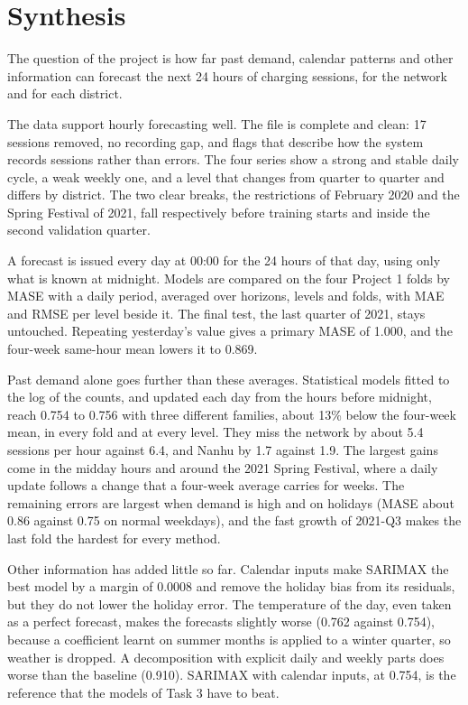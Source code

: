 \documentclass[12pt,a4paper,openany]{report}
\begin{document}
\chapter{Synthesis}\label{ch:synthesis}

The question of the project is how far past demand, calendar patterns and other information can forecast the next
24 hours of charging sessions, for the network and for each district.

The data support hourly forecasting well. The file is complete and clean: 17 sessions removed, no recording gap, and
flags that describe how the system records sessions rather than errors. The four series show a strong and stable
daily cycle, a weak weekly one, and a level that changes from quarter to quarter and differs by district. The two
clear breaks, the restrictions of February 2020 and the Spring Festival of 2021, fall respectively before training
starts and inside the second validation quarter.

A forecast is issued every day at 00:00 for the 24 hours of that day, using only what is known at midnight. Models
are compared on the four Project 1 folds by \ac{MASE} with a daily period, averaged over horizons, levels and folds,
with \ac{MAE} and \ac{RMSE} per level beside it. The final test, the last quarter of 2021, stays untouched. Repeating
yesterday's value gives a primary \ac{MASE} of 1.000, and the four-week same-hour mean lowers it to 0.869.

Past demand alone goes further than these averages. Statistical models fitted to the log of the counts, and updated
each day from the hours before midnight, reach 0.754 to 0.756 with three different families, about 13\% below the
four-week mean, in every fold and at every level. They miss the network by about 5.4 sessions per hour against 6.4,
and Nanhu by 1.7 against 1.9. The largest gains come in the midday hours and around the 2021 Spring Festival, where a
daily update follows a change that a four-week average carries for weeks. The remaining errors are largest when
demand is high and on holidays (\ac{MASE} about 0.86 against 0.75 on normal weekdays), and the fast growth of 2021-Q3
makes the last fold the hardest for every method.

Other information has added little so far. Calendar inputs make \ac{SARIMAX} the best model by a margin of 0.0008
and remove the holiday bias from its residuals, but they do not lower the holiday error. The temperature of the day,
even taken as a perfect forecast, makes the forecasts slightly worse (0.762 against 0.754), because a coefficient
learnt on summer months is applied to a winter quarter, so weather is dropped. A decomposition with explicit daily
and weekly parts does worse than the baseline (0.910). \ac{SARIMAX} with calendar inputs, at 0.754, is the reference
that the models of Task 3 have to beat.
\end{document}
